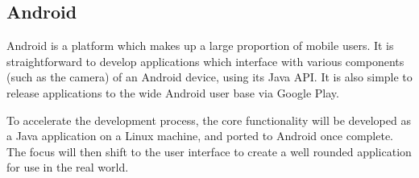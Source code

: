\subsection{Android}

Android\cite{android} is a platform which makes up a large proportion of mobile users. It is straightforward to develop applications which interface with various components (such as the camera) of an Android device, using its Java\cite{java} API. It is also simple to release applications to the wide Android user base via Google Play\cite{googleplay}.

To accelerate the development process, the core functionality will be developed as a Java application on a Linux machine, and ported to Android once complete. The focus will then shift to the user interface to create a well rounded application for use in the real world.
